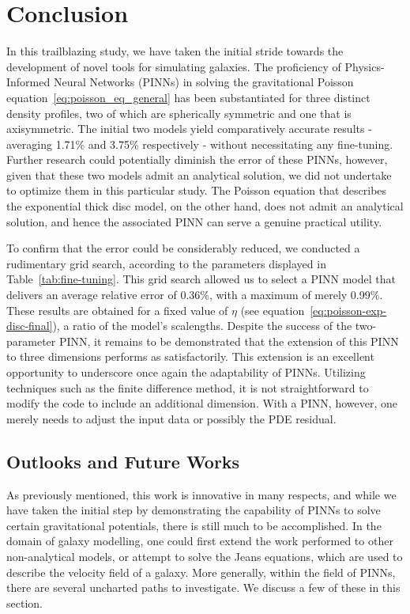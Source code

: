 \chapter{Conclusion}\label{ch:conclusion}

In this trailblazing study, we have taken the initial stride towards the development of novel tools for simulating galaxies. The proficiency of Physics-Informed Neural Networks (PINNs) in solving the gravitational Poisson equation~\eqref{eq:poisson_eq_general} has been substantiated for three distinct density profiles, two of which are spherically symmetric and one that is axisymmetric. The initial two models yield comparatively accurate results - averaging 1.71\% and 3.75\% respectively - without necessitating any fine-tuning. Further research could potentially diminish the error of these PINNs, however, given that these two models admit an analytical solution, we did not undertake to optimize them in this particular study. The Poisson equation that describes the exponential thick disc model, on the other hand, does not admit an analytical solution, and hence the associated PINN can serve a genuine practical utility.

To confirm that the error could be considerably reduced, we conducted a rudimentary grid search, according to the parameters displayed in Table~\ref{tab:fine-tuning}. This grid search allowed us to select a PINN model that delivers an average relative error of 0.36\%, with a maximum of merely 0.99\%. These results are obtained for a fixed value of $\eta$ (see equation~\eqref{eq:poisson-exp-disc-final}), a ratio of the model's scalengths. Despite the success of the two-parameter PINN, it remains to be demonstrated that the extension of this PINN to three dimensions performs as satisfactorily. This extension is an excellent opportunity to underscore once again the adaptability of PINNs. Utilizing techniques such as the finite difference method, it is not straightforward to modify the code to include an additional dimension. With a PINN, however, one merely needs to adjust the input data or possibly the PDE residual.


\section{Outlooks and Future Works}

As previously mentioned, this work is innovative in many respects, and while we have taken the initial step by demonstrating the capability of PINNs to solve certain gravitational potentials, there is still much to be accomplished. In the domain of galaxy modelling, one could first extend the work performed to other non-analytical models, or attempt to solve the Jeans equations, which are used to describe the velocity field of a galaxy. More generally, within the field of PINNs, there are several uncharted paths to investigate. We discuss a few of these in this section.
